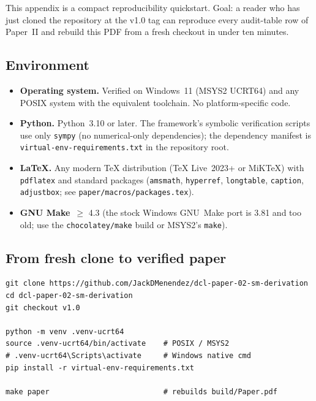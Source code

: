 \label{sec:reproducibility}

This appendix is a compact reproducibility quickstart.  Goal: a
reader who has just cloned the repository at the v1.0 tag can
reproduce every audit-table row of Paper~II and rebuild this
PDF from a fresh checkout in under ten minutes.

\subsection{Environment}
\label{subsec:repro_environment}

\begin{itemize}
\item \textbf{Operating system.}  Verified on Windows~11 (MSYS2
  UCRT64) and any POSIX system with the equivalent toolchain.
  No platform-specific code.
\item \textbf{Python.}  Python~3.10 or later.  The framework's
  symbolic verification scripts use only \texttt{sympy} (no
  numerical-only dependencies); the dependency manifest is
  \nolinkurl{virtual-env-requirements.txt} in the repository
  root.
\item \textbf{LaTeX.}  Any modern TeX distribution (TeX Live~2023+
  or MiKTeX) with \texttt{pdflatex} and standard packages
  (\texttt{amsmath}, \texttt{hyperref}, \texttt{longtable},
  \texttt{caption}, \texttt{adjustbox}; see
  \nolinkurl{paper/macros/packages.tex}).
\item \textbf{GNU Make}~$\geq$ 4.3 (the stock Windows GNU~Make port
  is 3.81 and too old; use the \texttt{chocolatey/make} build or
  MSYS2's \texttt{make}).
\end{itemize}

\subsection{From fresh clone to verified paper}
\label{subsec:repro_steps}

\begin{verbatim}
git clone https://github.com/JackDMenendez/dcl-paper-02-sm-derivation
cd dcl-paper-02-sm-derivation
git checkout v1.0

python -m venv .venv-ucrt64
source .venv-ucrt64/bin/activate    # POSIX / MSYS2
# .venv-ucrt64\Scripts\activate     # Windows native cmd
pip install -r virtual-env-requirements.txt

make paper                          # rebuilds build/Paper.pdf
\end{verbatim}

